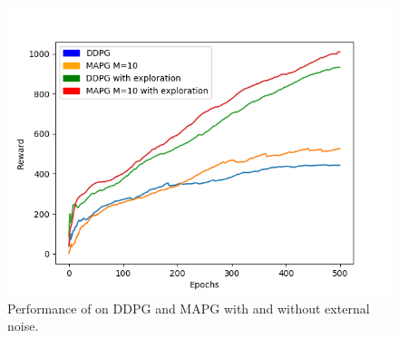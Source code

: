 \begin{figure}[h]
\centering
    \begin{minipage}[b]{.8\textwidth}
        \centering
        \includegraphics[width=.9\textwidth]{figures/walker_expl.png}
    \end{minipage}
    \caption{Performance of  on DDPG and MAPG with and without external noise.}
    \label{fig:exploration-walker}
\end{figure}
